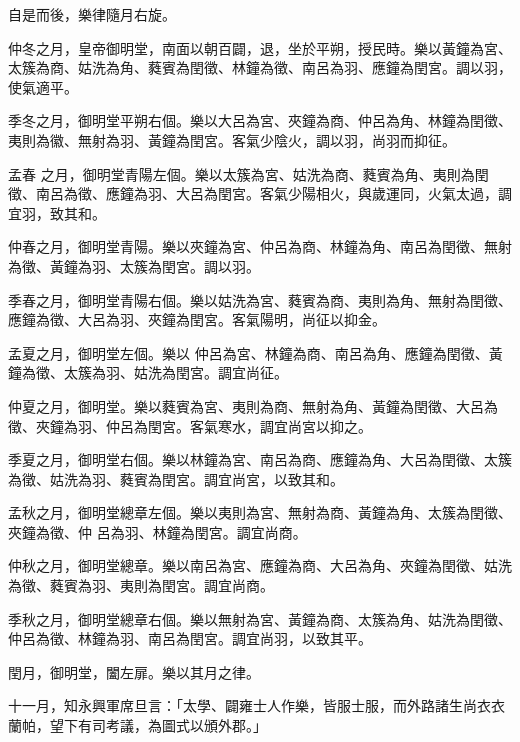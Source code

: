 \begin{pinyinscope}
 自是而後，樂律隨月右旋。



 仲冬之月，皇帝御明堂，南面以朝百闢，退，坐於平朔，授民時。樂以黃鐘為宮、太簇為商、姑洗為角、蕤賓為閏徵、林鐘為徵、南呂為羽、應鐘為閏宮。調以羽，使氣適平。



 季冬之月，御明堂平朔右個。樂以大呂為宮、夾鐘為商、仲呂為角、林鐘為閏徵、夷則為徽、無射為羽、黃鐘為閏宮。客氣少陰火，調以羽，尚羽而抑征。



 孟春
 之月，御明堂青陽左個。樂以太簇為宮、姑洗為商、蕤賓為角、夷則為閏徵、南呂為徵、應鐘為羽、大呂為閏宮。客氣少陽相火，與歲運同，火氣太過，調宜羽，致其和。



 仲春之月，御明堂青陽。樂以夾鐘為宮、仲呂為商、林鐘為角、南呂為閏徵、無射為徵、黃鐘為羽、太簇為閏宮。調以羽。



 季春之月，御明堂青陽右個。樂以姑洗為宮、蕤賓為商、夷則為角、無射為閏徵、應鐘為徵、大呂為羽、夾鐘為閏宮。客氣陽明，尚征以抑金。



 孟夏之月，御明堂左個。樂以
 仲呂為宮、林鐘為商、南呂為角、應鐘為閏徵、黃鐘為徵、太簇為羽、姑洗為閏宮。調宜尚征。



 仲夏之月，御明堂。樂以蕤賓為宮、夷則為商、無射為角、黃鐘為閏徵、大呂為徵、夾鐘為羽、仲呂為閏宮。客氣寒水，調宜尚宮以抑之。



 季夏之月，御明堂右個。樂以林鐘為宮、南呂為商、應鐘為角、大呂為閏徵、太簇為徵、姑洗為羽、蕤賓為閏宮。調宜尚宮，以致其和。



 孟秋之月，御明堂總章左個。樂以夷則為宮、無射為商、黃鐘為角、太簇為閏徵、夾鐘為徵、仲
 呂為羽、林鐘為閏宮。調宜尚商。



 仲秋之月，御明堂總章。樂以南呂為宮、應鐘為商、大呂為角、夾鐘為閏徵、姑洗為徵、蕤賓為羽、夷則為閏宮。調宜尚商。



 季秋之月，御明堂總章右個。樂以無射為宮、黃鐘為商、太簇為角、姑洗為閏徵、仲呂為徵、林鐘為羽、南呂為閏宮。調宜尚羽，以致其平。



 閏月，御明堂，闔左扉。樂以其月之律。



 十一月，知永興軍席旦言：「太學、闢雍士人作樂，皆服士服，而外路諸生尚衣衣蘭帕，望下有司考議，為圖式以頒外郡。」




\end{pinyinscope}
